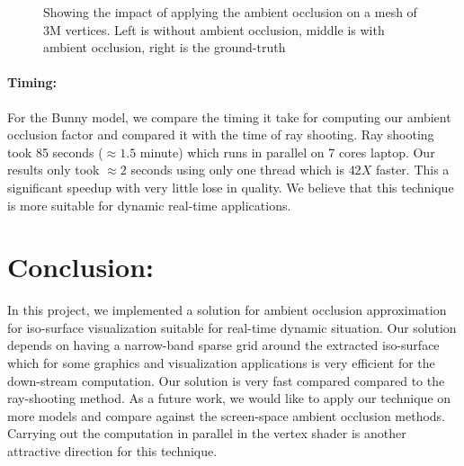 \documentclass[a4paper,10pt]{article}
\begin{document}
\begin{figure}[!tbh]
\centering        
   \caption{Showing the impact of applying the ambient occlusion on a mesh of 3M vertices. Left is without ambient occlusion, middle is with ambient occlusion, right is the ground-truth}
   \label{fig:bunny_ao}
\end{figure}

\paragraph{Timing:}
For the Bunny model, we compare the timing it take for computing our ambient occlusion factor and compared it with the time of ray shooting. Ray shooting took 85 seconds ($\approx 1.5$ minute) which runs in parallel on 7 cores laptop. Our results only took $\approx 2$ seconds using only one thread which is $42X$ faster. This a significant speedup with very little lose in quality. We believe that this technique is more suitable for dynamic real-time applications. 


\section{Conclusion:}
In this project, we implemented a solution for ambient occlusion approximation for iso-surface visualization suitable for real-time dynamic situation. Our solution depends on having a narrow-band sparse grid around the extracted iso-surface which for some graphics and visualization applications is very efficient for the down-stream computation. Our solution is very fast compared compared to the ray-shooting method. As a future work, we would like to apply our technique on more models and compare against the screen-space ambient occlusion methods. Carrying out the computation in parallel in the vertex shader is another attractive direction for this technique. 
 
\medskip


\end{document}
